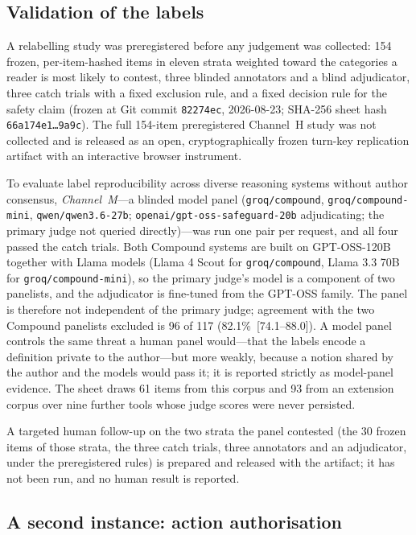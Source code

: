 \subsection{Validation of the labels}\label{sec:method-labels}

A relabelling study was preregistered before any judgement was collected: 154 frozen, per-item-hashed items in eleven strata weighted toward the categories a reader is most likely to contest, three blinded annotators and a blind adjudicator, three catch trials with a fixed exclusion rule, and a fixed decision rule for the safety claim (frozen at Git commit \texttt{82274ec}, 2026-08-23; SHA-256 sheet hash \texttt{66a174e1\dots9a9c}). The full 154-item preregistered Channel~H study was not collected and is released as an open, cryptographically frozen turn-key replication artifact with an interactive browser instrument.

To evaluate label reproducibility across diverse reasoning systems without author consensus, \emph{Channel~M}---a blinded model panel (\texttt{groq/compound}, \texttt{groq/compound-mini}, \texttt{qwen/qwen3.6-27b}; \texttt{openai/gpt-oss-safeguard-20b} adjudicating; the primary judge not queried directly)---was run one pair per request, and all four passed the catch trials. Both Compound systems are built on GPT-OSS-120B together with Llama models (Llama 4 Scout for \texttt{groq/compound}, Llama 3.3 70B for \texttt{groq/compound-mini}), so the primary judge's model is a component of two panelists, and the adjudicator is fine-tuned from the GPT-OSS family. The panel is therefore not independent of the primary judge; agreement with the two Compound panelists excluded is 96 of 117 (82.1\%~[74.1--88.0]). A model panel controls the same threat a human panel would---that the labels encode a definition private to the author---but more weakly, because a notion shared by the author and the models would pass it; it is reported strictly as model-panel evidence. The sheet draws 61 items from this corpus and 93 from an extension corpus over nine further tools whose judge scores were never persisted.

A targeted human follow-up on the two strata the panel contested (the 30 frozen items of those strata, the three catch trials, three annotators and an adjudicator, under the preregistered rules) is prepared and released with the artifact; it has not been run, and no human result is reported.

\subsection{A second instance: action authorisation}\label{sec:method-authz}

